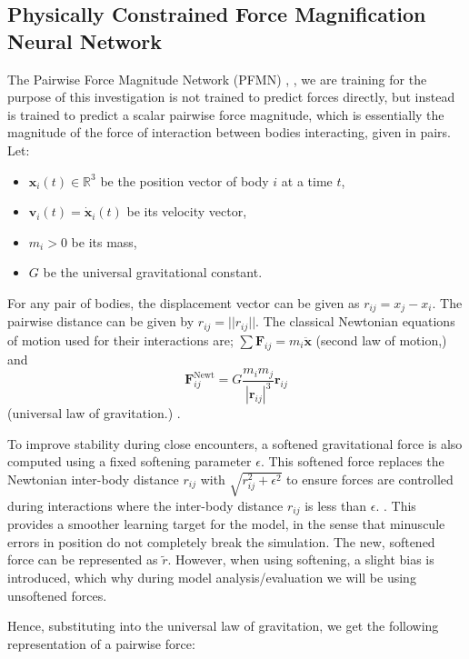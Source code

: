 \documentclass[12pt]{article}
\begin{document}
\subsection{Physically Constrained Force Magnification Neural Network}
The Pairwise Force Magnitude Network (PFMN) \cite{nguyen2021pairwise}, \cite{battaglia2016interaction}, we are training for the purpose of this investigation is not trained to predict forces directly, but instead is trained to predict a scalar pairwise force magnitude, which is essentially the magnitude of the force of interaction between bodies interacting, given in pairs. Let:
\begin{itemize}
    \item \textbf{$\mathbf{x}_i(t) \in \mathbb{R}^3$} be the position vector of body $i$ at a time $t$,
    \item \textbf{$\mathbf{v}_i (t) = \mathbf{\dot x}_i(t)$} be its velocity vector,
    \item \textbf{$m_i > 0$} be its mass,
    \item \textbf{$G$} be the universal gravitational constant.
\end{itemize}

For any pair of bodies, the displacement vector can be given as $r_{ij} = x_j - x_i$. The pairwise distance can be given by $r_{ij} = ||r_{ij}||$. The classical Newtonian equations of motion used for their interactions are; $\sum \mathbf{F}_{ij} = m_i \mathbf{\ddot x}$ (second law of motion,) and $$\mathbf{F}_{ij}^{\text{Newt}} = G \frac{m_i m_j}{|\mathbf{r}_{ij}|^3} \mathbf{r}_{ij}$$ (universal law of gravitation.) \cite{murray1999solar}.

To improve stability during close encounters, a softened gravitational force is also computed using a fixed softening parameter $\epsilon$. This softened force replaces the Newtonian inter-body distance $r_{ij}$ with $\sqrt{r^2_{ij} + \epsilon^2}$ to ensure forces are controlled during interactions where the inter-body distance $r_{ij}$ is less than $\epsilon$. \cite{Dehnen2001}. This provides a smoother learning target for the model, in the sense that minuscule errors in position do not completely break the simulation. The new, softened force can be represented as $\tilde{r}$. However, when using softening, a slight bias is introduced, which why during model analysis/evaluation we will be using unsoftened forces.

Hence, substituting into the universal law of gravitation, we get the following representation of a pairwise force:
\end{document}
